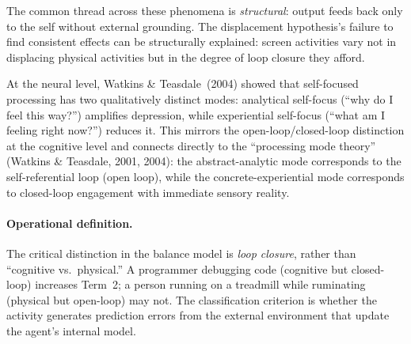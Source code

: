 \documentclass[a4paper,11pt,titlepage]{article}
\begin{document}
The common thread across these phenomena is \textit{structural}: output feeds back only to the self without external grounding.  The displacement hypothesis's failure to find consistent effects can be structurally explained: screen activities vary not in displacing physical activities but in the degree of loop closure they afford.

At the neural level, Watkins \& Teasdale~(2004) showed that self-focused processing has two qualitatively distinct modes: analytical self-focus (``why do I feel this way?'') amplifies depression, while experiential self-focus (``what am I feeling right now?'') reduces it. This mirrors the open-loop/closed-loop distinction at the cognitive level and connects directly to the ``processing mode theory'' (Watkins \& Teasdale, 2001, 2004): the abstract-analytic mode corresponds to the self-referential loop (open loop), while the concrete-experiential mode corresponds to closed-loop engagement with immediate sensory reality.

\paragraph{Operational definition.} The critical distinction in the balance model is \textit{loop closure}, rather than ``cognitive vs.\ physical.'' A programmer debugging code (cognitive but closed-loop) increases Term~2; a person running on a treadmill while ruminating (physical but open-loop) may not. The classification criterion is whether the activity generates prediction errors from the external environment that update the agent's internal model.
\end{document}
